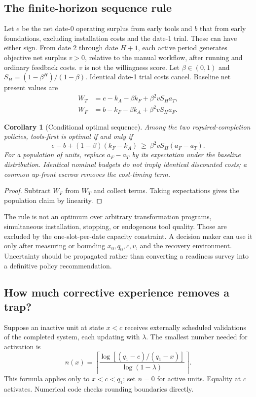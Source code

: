 \documentclass[11pt]{article}
\newtheorem{corollary}{Corollary}
\begin{document}
\subsection{The finite-horizon sequence rule}
Let $e$ be the net date-0 operating surplus from early tools and $b$ that from early foundations, excluding installation costs and the date-1 trial. These can have either sign. From date 2 through date $H+1$, each active period generates objective net surplus $v>0$, relative to the manual workflow, after running and ordinary feedback costs. $v$ is not the willingness score. Let $\beta\in(0,1)$ and $S_H=(1-\beta^H)/(1-\beta)$. Identical date-1 trial costs cancel. Baseline net present values are
\begin{align}
 W_T&=e-k_A-\beta k_F+\beta^2 vS_Ha_T,\\
 W_F&=b-k_F-\beta k_A+\beta^2 vS_Ha_F.
\end{align}
\begin{corollary}[Conditional optimal sequence]\label{cor:npv}
Among the two required-completion policies, tools-first is optimal if and only if
\begin{equation}
 e-b+(1-\beta)(k_F-k_A)\ \geq\ \beta^2vS_H(a_F-a_T).\label{eq:npv}
\end{equation}
For a population of units, replace $a_F-a_T$ by its expectation under the baseline distribution. Identical nominal budgets do not imply identical discounted costs; a common up-front escrow removes the cost-timing term.
\end{corollary}
\begin{proof}
Subtract $W_F$ from $W_T$ and collect terms. Taking expectations gives the population claim by linearity.
\end{proof}
The rule is not an optimum over arbitrary transformation programs, simultaneous installation, stopping, or endogenous tool quality. Those are excluded by the one-slot-per-date capacity constraint. A decision maker can use it only after measuring or bounding $x_0,q_0,c,v$, and the recovery environment. Uncertainty should be propagated rather than converting a readiness survey into a definitive policy recommendation.

\subsection{How much corrective experience removes a trap?}
Suppose an inactive unit at state $x<c$ receives externally scheduled validations of the completed system, each updating with $\lambda$. The smallest number needed for activation is
\begin{equation}
 n(x)=\left\lceil\frac{\log[(q_1-c)/(q_1-x)]}{\log(1-\lambda)}\right\rceil.\label{eq:n}
\end{equation}
This formula applies only to $x<c<q_1$; set $n=0$ for active units. Equality at $c$ activates. Numerical code checks rounding boundaries directly.
\end{document}
